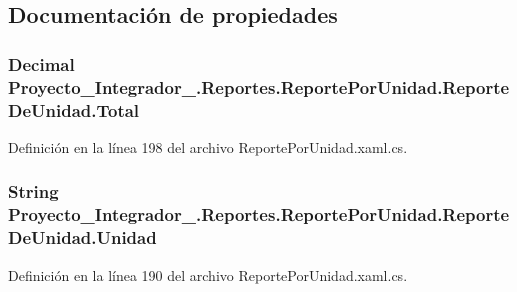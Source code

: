 \subsection{Documentación de propiedades}
\hypertarget{class_proyecto___integrador__3_1_1_reportes_1_1_reporte_por_unidad_1_1_reporte_de_unidad_aa8bef252a8dd45d28c2ee1b24f6a1a69}{
\subsubsection[{Total}]{\setlength{\rightskip}{0pt plus 5cm}Decimal Proyecto\-\_\-\-Integrador\-\_.\-Reportes.\-Reporte\-Por\-Unidad.\-Reporte\-De\-Unidad.\-Total\hspace{0.3cm}{\ttfamily [get]}}}\label{class_proyecto___integrador__3_1_1_reportes_1_1_reporte_por_unidad_1_1_reporte_de_unidad_aa8bef252a8dd45d28c2ee1b24f6a1a69}


Definición en la línea 198 del archivo Reporte\-Por\-Unidad.\-xaml.\-cs.

\hypertarget{class_proyecto___integrador__3_1_1_reportes_1_1_reporte_por_unidad_1_1_reporte_de_unidad_a70b93e2ee97c9a831953b5060debc1f1}{
\subsubsection[{Unidad}]{\setlength{\rightskip}{0pt plus 5cm}String Proyecto\-\_\-\-Integrador\-\_.\-Reportes.\-Reporte\-Por\-Unidad.\-Reporte\-De\-Unidad.\-Unidad\hspace{0.3cm}{\ttfamily [get]}}}\label{class_proyecto___integrador__3_1_1_reportes_1_1_reporte_por_unidad_1_1_reporte_de_unidad_a70b93e2ee97c9a831953b5060debc1f1}


Definición en la línea 190 del archivo Reporte\-Por\-Unidad.\-xaml.\-cs.


